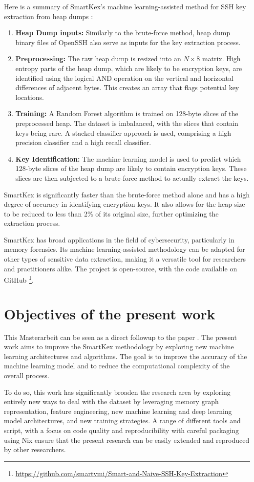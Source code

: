     Here is a summary of SmartKex's machine learning-assisted method for SSH key extraction from heap dumps \cite{SmartKex22}:

    \begin{enumerate}
        \item \textbf{Heap Dump inputs:} Similarly to the brute-force method, heap dump binary files of OpenSSH also serve as inputs for the key extraction process.
        \item \textbf{Preprocessing:} The raw heap dump is resized into an $N \times 8$ matrix. High entropy parts of the heap dump, which are likely to be encryption keys, are identified using the logical AND operation on the vertical and horizontal differences of adjacent bytes. This creates an array that flags potential key locations.
        \item \textbf{Training:} A Random Forest algorithm is trained on 128-byte slices of the preprocessed heap. The dataset is imbalanced, with the slices that contain keys being rare. A stacked classifier approach is used, comprising a high precision classifier and a high recall classifier.
        \item \textbf{Key Identification:} The machine learning model is used to predict which 128-byte slices of the heap dump are likely to contain encryption keys. These slices are then subjected to a brute-force method to actually extract the keys.
    \end{enumerate}
    
SmartKex is significantly faster than the brute-force method alone and has a high degree of accuracy in identifying encryption keys. It also allows for the heap size to be reduced to less than 2\% of its original size, further optimizing the extraction process.

SmartKex has broad applications in the field of cybersecurity, particularly in memory forensics. Its machine learning-assisted methodology can be adapted for other types of sensitive data extraction, making it a versatile tool for researchers and practitioners alike. The project is open-source, with the code available on GitHub \footnote{\url{https://github.com/smartvmi/Smart-and-Naive-SSH-Key-Extraction}}.

\section{Objectives of the present work}
This Masterarbeit can be seen as a direct followup to the paper . The present work aims to improve the SmartKex methodology by exploring new machine learning architectures and algorithms. The goal is to improve the accuracy of the machine learning model and to reduce the computational complexity of the overall process.

To do so, this work has significantly broaden the research area by exploring entirely new ways to deal with the dataset by leveraging memory graph representation, feature engineering, new machine learning and deep learning model architectures, and new training strategies. A range of different tools and script, with a focus on code quality and reproducibility with careful packaging using Nix ensure that the present research can be easily extended and reproduced by other researchers.
